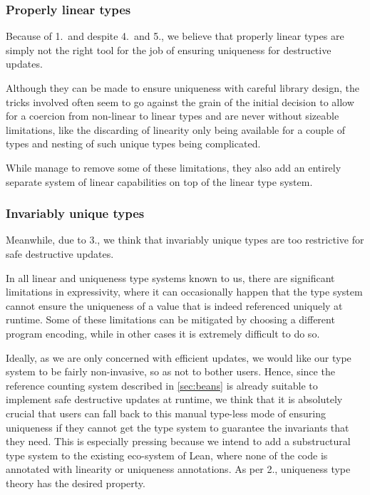 \subsubsection{Properly linear types}
Because of 1.\ and despite 4.\ and 5., we believe that properly linear types are simply not the right tool for the job of ensuring uniqueness for destructive updates. 

Although they can be made to ensure uniqueness with careful library design, the tricks involved often seem to go against the grain of the initial decision to allow for a coercion from non-linear to linear types and are never without sizeable limitations, like the discarding of linearity only being available for a couple of types and nesting of such unique types being complicated. 

While \cite{spiwack_linearly_2022} manage to remove some of these limitations, they also add an entirely separate system of linear capabilities on top of the linear type system.

\subsubsection{Invariably unique types}
Meanwhile, due to 3., we think that invariably unique types are too restrictive for safe destructive updates. 

In all linear and uniqueness type systems known to us, there are significant limitations in expressivity, where it can occasionally happen that the type system cannot ensure the uniqueness of a value that is indeed referenced uniquely at runtime. Some of these limitations can be mitigated by choosing a different program encoding, while in other cases it is extremely difficult to do so. 

Ideally, as we are only concerned with efficient updates, we would like our type system to be fairly non-invasive, so as not to bother users. Hence, since the reference counting system described in \cref{sec:beans} is already suitable to implement safe destructive updates at runtime, we think that it is absolutely crucial that users can fall back to this manual type-less mode of ensuring uniqueness if they cannot get the type system to guarantee the invariants that they need. This is especially pressing because we intend to add a substructural type system to the existing eco-system of Lean, where none of the code is annotated with linearity or uniqueness annotations. As per 2., uniqueness type theory has the desired property.

